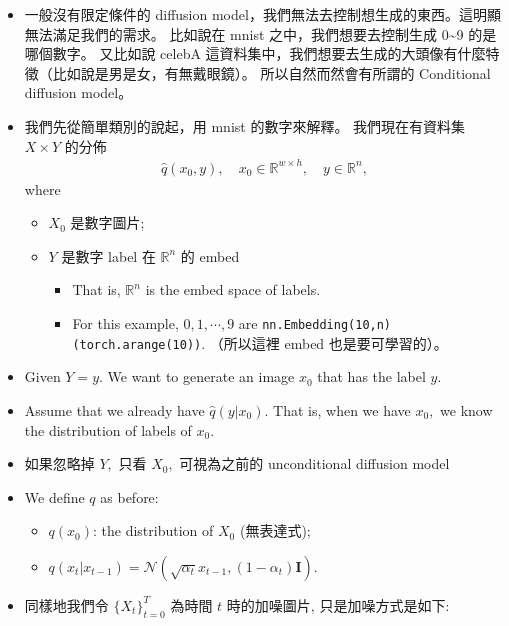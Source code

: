 \documentclass[
]{article}
\providecommand{\tightlist}{%
  \setlength{\itemsep}{0pt}\setlength{\parskip}{0pt}}\usepackage{longtable,booktabs,array}
\theoremstyle{remark}
\begin{document}
\begin{itemize}
\item
  一般沒有限定條件的 diffusion
  model，我們無法去控制想生成的東西。這明顯無法滿足我們的需求。 比如說在
  mnist 之中，我們想要去控制生成 0\textasciitilde9 的是哪個數字。
  又比如說 celebA
  這資料集中，我們想要去生成的大頭像有什麼特徵（比如說是男是女，有無戴眼鏡）。
  所以自然而然會有所謂的 Conditional diffusion model。
\item
  我們先從簡單類別的說起，用 mnist 的數字來解釋。 我們現在有資料集
  \(X \times Y\) 的分佈 \[
  \begin{aligned}
    \widehat{q}(x_0,y), \quad x_0 \in \mathbb R^{w\times h}, \quad y\in \mathbb R^n,
  \end{aligned}
  \] where

  \begin{itemize}
  \tightlist
  \item
    \(X_0\) 是數字圖片;
  \item
    \(Y\) 是數字 label 在 \(\mathbb R^n\) 的 embed

    \begin{itemize}
    \tightlist
    \item
      That is, \(\mathbb R^n\) is the embed space of labels.
    \item
      For this example, \(0,1,\cdots, 9\) are
      \texttt{nn.Embedding(10,n)(torch.arange(10))}. （所以這裡 embed
      也是要可學習的）。
    \end{itemize}
  \end{itemize}
\item
  Given \(Y = y.\) We want to generate an image \(x_0\) that has the
  label \(y.\)
\item
  Assume that we already have \(\widehat{q}(y\vert x_0).\) That is, when
  we have \(x_0,\) we know the distribution of labels of \(x_0.\)
\item
  如果忽略掉 \(Y,\) 只看 \(X_0,\) 可視為之前的 unconditional diffusion
  model
\item
  We define \(q\) as before:

  \begin{itemize}
  \tightlist
  \item
    \(q(x_0)\): the distribution of \(X_0\) (無表達式);
  \item
    \(q(x_t\vert x_{t-1})= \mathcal{N}(\sqrt{\alpha_t}x_{t-1}, (1-\alpha_t)\mathbf{I}).\)
  \end{itemize}
\item
  同樣地我們令 \(\lbrace X_t \rbrace_{t=0}^T\) 為時間 \(t\)
  時的加噪圖片, 只是加噪方式是如下:


\end{itemize}
\end{document}
